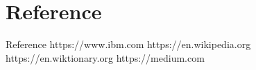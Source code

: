 \section{Reference}
	\begin{frame}{Reference}
	\fontsize{15}{1}\selectfont
	    [1]https://www.ibm.com
	    \newline\newline
	    [2]https://en.wikipedia.org
	    \newline\newline
	    [3]https://en.wiktionary.org
	    \newline \newline
	    [4]https://medium.com
	 
\end{frame}